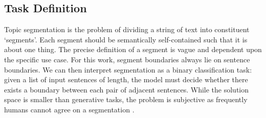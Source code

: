 
\subsection{Task Definition}



Topic segmentation is the problem of dividing a string of text into constituent `segments'. Each segment should be semantically self-contained such that it is about one thing. The precise definition of a segment is vague and dependent upon the specific use case. For this work, segment boundaries always lie on sentence boundaries. We can then interpret segmentation as a binary classification task: given a list of input sentences of length, the model must decide whether there exists a boundary between each pair of adjacent sentences. While the solution space is smaller than generative tasks, the problem is subjective as frequently humans cannot agree on a segmentation \cite{TextTiling}.



 
